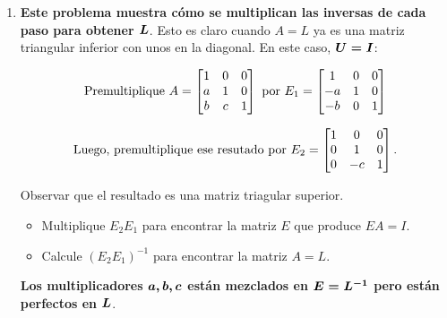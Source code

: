 \documentclass[12pt,a4paper]{article}
\newcommand{\bi}[1]{\hbox{\boldmath$#1$}}
\newcommand\1{\mbox{\,\vrule height-0.8pt depth1.0pt width2pc\,}}
\newcommand\2{\mbox{\,\vrule height-0.8pt depth1.0pt width1pc\,}}
\begin{document}
\begin{enumerate}
\item \textbf{Este problema muestra cómo se multiplican las inversas de cada paso para obtener $\bi{L}$}. Esto es claro cuando $A=L$ ya es una matriz triangular inferior con unos en la diagonal.
En este caso,  $\bi{U=I}$: 

\begin{displaymath}
\hbox{Premultiplique }  A=\begin{bmatrix}
    1 & 0 & 0\\ a & 1 & 0\\ b & c & 1
  \end{bmatrix} \text{ por } E_1=
  \begin{bmatrix}
  1& 0& 0\\-a&1&0\\-b&0&1
\end{bmatrix}
\end{displaymath}

\begin{displaymath}
\hbox{Luego, premultiplique ese resutado por } E_2=
  \begin{bmatrix}1&0&0\\0&1&0\\0&-c&1\\
  \end{bmatrix}.
\end{displaymath}

Observar que el resultado es una matriz triagular superior.

%
%

\begin{itemize}
\item[(a)] Multiplique $E_{2}E_{1}$ para encontrar la matriz $E$ que produce $EA=I$.
\item[(b)] Calcule $(E_2E_1)^{-1}$ para encontrar la matriz $A=L$.
\end{itemize}

\textbf{Los multiplicadores $\bi{a, b, c}$ están mezclados en $\bi{E=L^{-1}}$ pero est\'an perfectos en $\bi{L}$}.


\end{enumerate}
\end{document}
